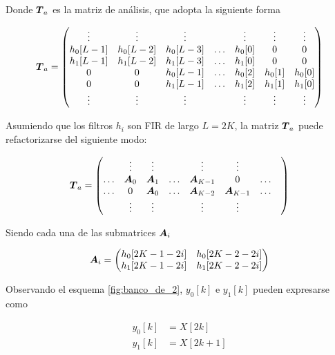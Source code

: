 Donde $\boldsymbol{T}_a$ es la matriz de análisis, que adopta la siguiente forma

	\begin{equation}
		\vect{T}_a=
		\begin{pmatrix*}[c]
			\vdots & \vdots & \vdots & & \vdots & \vdots & \vdots\\
			h_0[L-1] & h_0[L-2] & h_0[L-3] & \hdots & h_0[0] & 0 & 0 \\
			h_1[L-1] & h_1[L-2] & h_1[L-3] & \hdots & h_1[0] & 0 & 0 \\
			0 & 0 & h_0[L-1] & \hdots & h_0[2] & h_0[1] & h_0[0] \\
			0 & 0 & h_1[L-1] & \hdots & h_1[2] & h_1[1] & h_1[0] \\
			\vdots & \vdots & \vdots & & \vdots & \vdots & \vdots \\
		\end{pmatrix*}
	\end{equation}

Asumiendo que los filtros $h_i$ son FIR de largo $L=2K$, la matriz $\boldsymbol{T}_a$ puede refactorizarse del siguiente modo:

	\begin{equation}
		\vect{T}_a=
		\begin{pmatrix*}[c]
			 & \vdots & \vdots &  & \vdots & \vdots & &\\
			\hdots & \vect{A}_0 & \vect{A}_1 & \hdots & \vect{A}_{K-1} & 0 & \hdots  \\
			\hdots & 0 & \vect{A}_0 & \hdots & \vect{A}_{K-2} & \vect{A}_{K-1} & \hdots  \\
			 & \vdots & \vdots &  & \vdots & \vdots & &\\		
		\end{pmatrix*}
	\end{equation}

Siendo cada una de las submatrices $\boldsymbol{A}_i$

	\begin{equation}
		\vect{A}_i=
		\begin{pmatrix*}[c]
			h_0[2K-1-2i] & h_0[2K-2-2i] \\
			h_1[2K-1-2i] & h_1[2K-2-2i] \\
		\end{pmatrix*}
	\end{equation}

Observando el esquema \ref{fig:banco_de_2}, $y_0[k]$ e $y_1[k]$ pueden expresarse como

	\begin{align}
		y_0[k]&=X[2k]	\\
		y_1[k]&=X[2k+1]
	\end{align}

